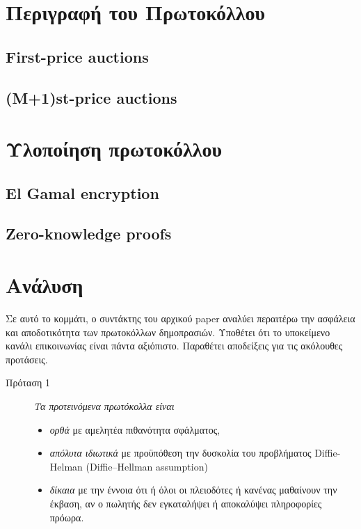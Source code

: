 \documentclass[letterpaper,11pt]{article}
\begin{document}
\section{Περιγραφή του Πρωτοκόλλου}

	\subsection{First-price auctions}
	\subsection{(M+1)st-price auctions}

\section{Υλοποίηση πρωτοκόλλου}

	\subsection{El Gamal encryption}
	\subsection{Zero-knowledge proofs}
	
\section{Ανάλυση}

Σε αυτό το κομμάτι, ο συντάκτης του αρχικού paper αναλύει περαιτέρω την ασφάλεια και αποδοτικότητα των πρωτοκόλλων δημοπρασιών. Υποθέτει ότι το
υποκείμενο κανάλι επικοινωνίας είναι πάντα αξιόπιστο. Παραθέτει αποδείξεις για τις ακόλουθες προτάσεις.

\begin{description}
	\item[Πρόταση 1] \emph{Τα προτεινόμενα πρωτόκολλα είναι}
		\begin{itemize}
			\item \emph{ορθά} με αμελητέα πιθανότητα σφάλματος,
			\item \emph{απόλυτα ιδιωτικά} με προϋπόθεση την δυσκολία του προβλήματος Diffie-Helman (Diffie–Hellman assumption) 
			\item \emph{δίκαια} με την έννοια ότι ή όλοι οι πλειοδότες ή κανένας μαθαίνουν την έκβαση, αν ο πωλητής δεν εγκαταλήψει ή αποκαλύψει
			πληροφορίες πρόωρα.
		\end{itemize}
\end{description}
\end{document}
